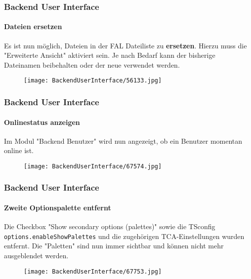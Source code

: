 \begin{frame}[fragile]
	\frametitle{Backend User Interface}
	\framesubtitle{Dateien ersetzen}

	Es ist nun möglich, Dateien in der FAL Dateiliste zu \textbf{ersetzen}.
	Hierzu muss die "Erweiterte Ansicht" aktiviert sein.
	Je nach Bedarf kann der bisherige Dateinamen beibehalten oder der neue verwendet werden.

	\begin{figure}
		\texttt{[image: BackendUserInterface/56133.jpg]}
	\end{figure}

\end{frame}

\begin{frame}[fragile]
	\frametitle{Backend User Interface}
	\framesubtitle{Onlinestatus anzeigen}

	Im Modul "Backend Benutzer" wird nun angezeigt, ob ein Benutzer momentan online ist.

	\begin{figure}
		\texttt{[image: BackendUserInterface/67574.jpg]}
	\end{figure}

\end{frame}

\begin{frame}[fragile]
	\frametitle{Backend User Interface}
	\framesubtitle{Zweite Optionspalette entfernt}

	Die Checkbox "Show secondary options (palettes)" sowie die TSconfig \texttt{options.enableShowPalettes}
	und die zugehörigen TCA-Einstellungen wurden entfernt. Die "Paletten" sind nun immer sichtbar und
	können nicht mehr ausgeblendet werden.

	\begin{figure}
		\texttt{[image: BackendUserInterface/67753.jpg]}
	\end{figure}

\end{frame}

